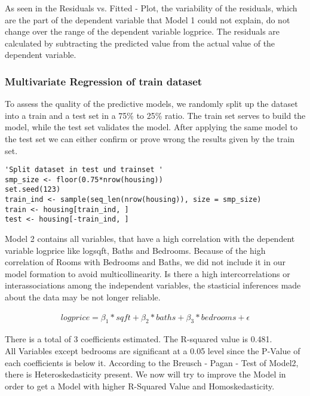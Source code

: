 As seen in the Residuals vs. Fitted - Plot, the variability of the residuals, which are the part of the dependent variable that Model 1 could not explain, do not change over the range of the dependent variable logprice. The residuals are calculated by subtracting the predicted value from the actual value of the dependent variable. \\


\subsubsection{Multivariate Regression of train dataset}

To assess the quality of the predictive models, we randomly split up the dataset into a train and a test set in a 75\% to 25\% ratio.
The train set serves to build the model, while the test set validates the model. After applying the same model to the test set we can either confirm or prove wrong the results given by the train set.

\begin{lstlisting}[frame = single,backgroundcolor=\color{hellgelb}]
'Split dataset in test und trainset '
smp_size <- floor(0.75*nrow(housing))
set.seed(123)
train_ind <- sample(seq_len(nrow(housing)), size = smp_size)
train <- housing[train_ind, ]
test <- housing[-train_ind, ]
\end{lstlisting}

Model 2 contains all variables, that have a high correlation with the dependent variable logprice like logsqft, Baths and Bedrooms. Because of the high correlation of Rooms with Bedrooms and Baths, we did not include it in our model formation to avoid multicollinearity. Is there a high intercorrelations or interassociations among the independent variables, the stasticial inferences made about the data may be not longer reliable.

\begin{align}
logprice = \beta_{1} * sqft +  \beta_{2}* baths + \beta_{3}* bedrooms + \epsilon 
\end{align}

There is a total of 3 coefficients estimated. The R-squared value is 0.481.  \\
All Variables except bedrooms are significant at a 0.05 level since the P-Value of each coefficients is below it. According to the Breusch - Pagan - Test of Model2, there is Heteroskedasticity present. We now will try to improve the Model in order to get a Model with higher R-Squared Value and Homoskedasticity. 
\\


